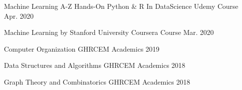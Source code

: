 

\begin{cvhonors}

  \cvhonor
    {Machine Learning A-Z}
    {Hands-On Python & R In DataScience} %
    {Udemy Course} %
    {Apr. 2020} %

  \cvhonor
    {Machine Learning} %
    {by Stanford University} %
    {Coursera Course} %
    {Mar. 2020} %
    
\cvhonor
    {Computer Organization} %
    {GHRCEM} %
    {Academics} %
    {2019} %

\cvhonor
    {Data Structures and Algorithms} %
    {GHRCEM} %
    {Academics} %
    {2018} %

\cvhonor
    {Graph Theory and Combinatorics} %
    {GHRCEM} %
    {Academics} %
    {2018} %

\end{cvhonors}
